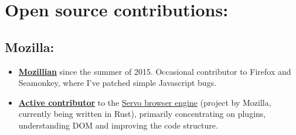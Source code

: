 \documentclass[11pt,a4paper,sans]{moderncv}        %
\newcommand\chref[3][linky]{\href{#2}{\color{#1}#3}}
\begin{document}
\makecvtitle



\section{Open source contributions:}
\subsection*{Mozilla:}
\begin{itemize}
\item \textbf{\chref{https://mozillians.org/en-US/u/wafflespeanut/}{Mozillian}} since the summer of 2015. Occasional contributor to Firefox and Seamonkey, where I've patched simple Javascript bugs.
\item \textbf{\chref{http://servostat.youknowone.org/}{Active contributor}} to the \chref{https://github.com/servo/servo}{Servo browser engine} (project by Mozilla, currently being written in Rust), primarily concentrating on plugins, understanding DOM and improving the code structure.
\end{itemize}
\end{document}
